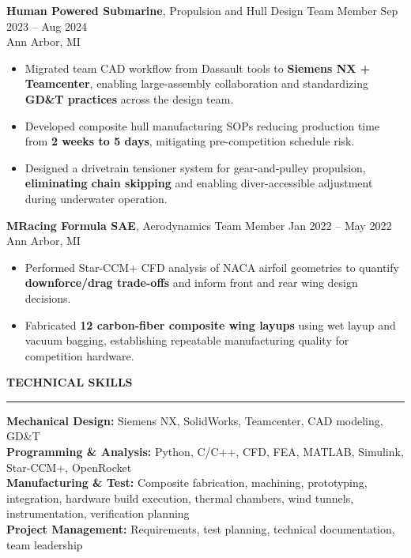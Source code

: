 \documentclass[10pt]{article}
\newcommand{\ressection}[1]{
  \vspace{0.12em}
  {\large\bfseries #1}\par
  \vspace{0.05em}\hrule\vspace{0.12em}
}
\begin{document}
{\bfseries Human Powered Submarine}, Propulsion and Hull Design Team Member \hfill Sep 2023 -- Aug 2024 \\
Ann Arbor, MI
\begin{itemize}
  \item Migrated team CAD workflow from Dassault tools to \textbf{Siemens NX + Teamcenter}, enabling large-assembly collaboration and standardizing \textbf{GD\&T practices} across the design team.
  \item Developed composite hull manufacturing SOPs reducing production time from \textbf{2 weeks to 5 days}, mitigating pre-competition schedule risk.
  \item Designed a drivetrain tensioner system for gear-and-pulley propulsion, \textbf{eliminating chain skipping} and enabling diver-accessible adjustment during underwater operation.

\end{itemize}

{\bfseries MRacing Formula SAE}, Aerodynamics Team Member \hfill Jan 2022 -- May 2022 \\
Ann Arbor, MI
\begin{itemize}
  \item Performed Star-CCM+ CFD analysis of NACA airfoil geometries to quantify \textbf{downforce/drag trade-offs} and inform front and rear wing design decisions.
  \item Fabricated \textbf{12 carbon-fiber composite wing layups} using wet layup and vacuum bagging, establishing repeatable manufacturing quality for competition hardware.

\end{itemize}

\ressection{TECHNICAL SKILLS}

\textbf{Mechanical Design:} Siemens NX, SolidWorks, Teamcenter, CAD modeling, GD\&T \\
\textbf{Programming \& Analysis:} Python, C/C++, CFD, FEA, MATLAB, Simulink, Star-CCM+, OpenRocket \\
\textbf{Manufacturing \& Test:} Composite fabrication, machining, prototyping, integration, hardware build execution, thermal chambers, wind tunnels, instrumentation, verification planning \\
\textbf{Project Management:} Requirements, test planning, technical documentation, team leadership
\end{document}
